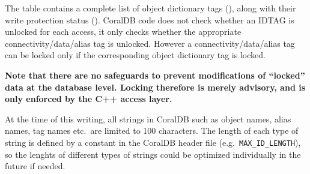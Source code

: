 The  table contains a complete list of
object dictionary tags (), along with their write
protection status ().  CoralDB code does not check whether
an IDTAG is unlocked for each access, it only checks whether the
appropriate connectivity/data/alias tag is unlocked.  However a
connectivity/data/alias tag can be locked only if the corresponding
object dictionary tag is locked.

\textbf{Note that there are no safeguards to prevent modifications of
  ``locked'' data at the database level.  Locking therefore is merely
  advisory, and is only enforced by the C++ access layer.}

At the time of this writing, all strings in CoralDB such as object names, alias names, tag
names etc.\ are limited to 100 characters. The length of each type of string is
defined by a constant in the CoralDB header file (e.g.\  {\tt MAX\_ID\_LENGTH}), so
the lenghts of different types of strings could be optimized individually in the
future if needed.


\endgroup
